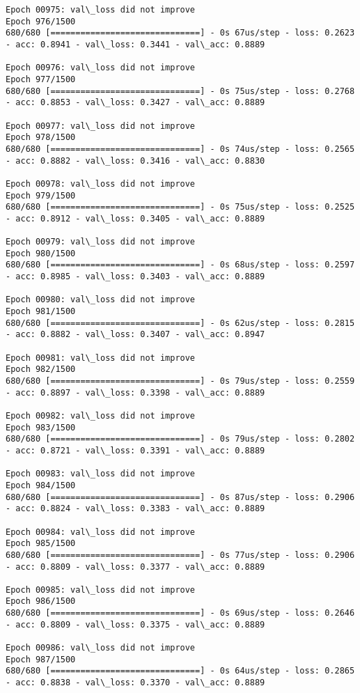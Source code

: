 \documentclass[11pt]{article}
\begin{document}
\begin{Verbatim}[commandchars=\\\{\}]
Epoch 00975: val\_loss did not improve
Epoch 976/1500
680/680 [==============================] - 0s 67us/step - loss: 0.2623 - acc: 0.8941 - val\_loss: 0.3441 - val\_acc: 0.8889

Epoch 00976: val\_loss did not improve
Epoch 977/1500
680/680 [==============================] - 0s 75us/step - loss: 0.2768 - acc: 0.8853 - val\_loss: 0.3427 - val\_acc: 0.8889

Epoch 00977: val\_loss did not improve
Epoch 978/1500
680/680 [==============================] - 0s 74us/step - loss: 0.2565 - acc: 0.8882 - val\_loss: 0.3416 - val\_acc: 0.8830

Epoch 00978: val\_loss did not improve
Epoch 979/1500
680/680 [==============================] - 0s 75us/step - loss: 0.2525 - acc: 0.8912 - val\_loss: 0.3405 - val\_acc: 0.8889

Epoch 00979: val\_loss did not improve
Epoch 980/1500
680/680 [==============================] - 0s 68us/step - loss: 0.2597 - acc: 0.8985 - val\_loss: 0.3403 - val\_acc: 0.8889

Epoch 00980: val\_loss did not improve
Epoch 981/1500
680/680 [==============================] - 0s 62us/step - loss: 0.2815 - acc: 0.8882 - val\_loss: 0.3407 - val\_acc: 0.8947

Epoch 00981: val\_loss did not improve
Epoch 982/1500
680/680 [==============================] - 0s 79us/step - loss: 0.2559 - acc: 0.8897 - val\_loss: 0.3398 - val\_acc: 0.8889

Epoch 00982: val\_loss did not improve
Epoch 983/1500
680/680 [==============================] - 0s 79us/step - loss: 0.2802 - acc: 0.8721 - val\_loss: 0.3391 - val\_acc: 0.8889

Epoch 00983: val\_loss did not improve
Epoch 984/1500
680/680 [==============================] - 0s 87us/step - loss: 0.2906 - acc: 0.8824 - val\_loss: 0.3383 - val\_acc: 0.8889

Epoch 00984: val\_loss did not improve
Epoch 985/1500
680/680 [==============================] - 0s 77us/step - loss: 0.2906 - acc: 0.8809 - val\_loss: 0.3377 - val\_acc: 0.8889

Epoch 00985: val\_loss did not improve
Epoch 986/1500
680/680 [==============================] - 0s 69us/step - loss: 0.2646 - acc: 0.8809 - val\_loss: 0.3375 - val\_acc: 0.8889

Epoch 00986: val\_loss did not improve
Epoch 987/1500
680/680 [==============================] - 0s 64us/step - loss: 0.2865 - acc: 0.8838 - val\_loss: 0.3370 - val\_acc: 0.8889


\end{Verbatim}
\end{document}
